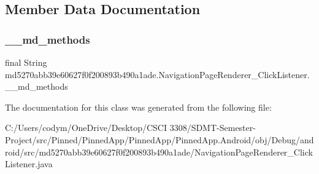 \subsection{Member Data Documentation}
\mbox{\label{classmd5270abb39e60627f0f200893b490a1ade_1_1_navigation_page_renderer___click_listener_a3e5649188cf3a8722bdde6c7da3dc717}} 
\subsubsection{\texorpdfstring{\+\_\+\+\_\+md\+\_\+methods}{\_\_md\_methods}}
{\footnotesize\ttfamily final String md5270abb39e60627f0f200893b490a1ade.\+Navigation\+Page\+Renderer\+\_\+\+Click\+Listener.\+\_\+\+\_\+md\+\_\+methods\hspace{0.3cm}{\ttfamily [static]}}



The documentation for this class was generated from the following file\+:\begin{DoxyCompactItemize}
\item 
C\+:/\+Users/codym/\+One\+Drive/\+Desktop/\+C\+S\+C\+I 3308/\+S\+D\+M\+T-\/\+Semester-\/\+Project/src/\+Pinned/\+Pinned\+App/\+Pinned\+App/\+Pinned\+App.\+Android/obj/\+Debug/android/src/md5270abb39e60627f0f200893b490a1ade/Navigation\+Page\+Renderer\+\_\+\+Click\+Listener.\+java\end{DoxyCompactItemize}
